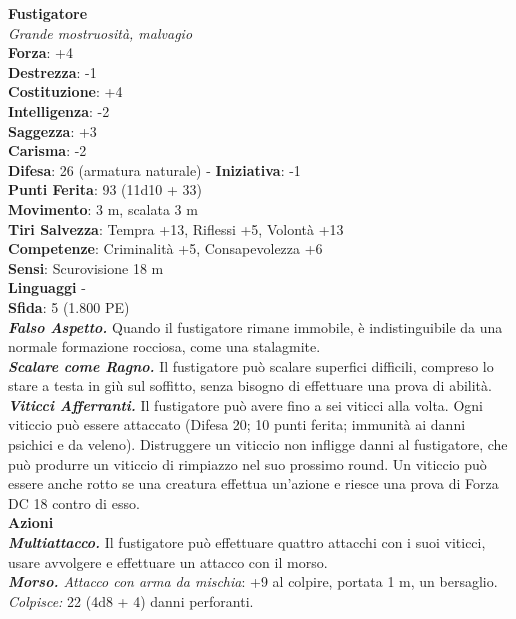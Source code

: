 \begin{multicols}{2}
\medskip\textbf{Fustigatore}\\
\emph{Grande mostruosità, malvagio}\\
\textbf{Forza}: +4\\
\textbf{Destrezza}: -1\\
\textbf{Costituzione}: +4\\
\textbf{Intelligenza}: -2\\
\textbf{Saggezza}: +3\\
\textbf{Carisma}: -2\\
\textbf{Difesa}: 26 (armatura naturale) - \textbf{Iniziativa}: -1\\
\textbf{Punti Ferita}: 93 (11d10 + 33)\\
\textbf{Movimento}: 3 m, scalata 3 m\\
\textbf{Tiri Salvezza}: Tempra +13, Riflessi +5, Volontà +13\\
\textbf{Competenze}: Criminalità +5, Consapevolezza +6\\
\textbf{Sensi}: Scurovisione 18 m\\
\textbf{Linguaggi} -\\
\textbf{Sfida}: 5 (1.800 PE)\smallskip\\
\emph{\textbf{Falso Aspetto.}} Quando il fustigatore rimane immobile, è indistinguibile da una normale formazione rocciosa, come una stalagmite.\\
\emph{\textbf{Scalare come Ragno.}} Il fustigatore può scalare superfici difficili, compreso lo stare a testa in giù sul soffitto, senza bisogno di effettuare una prova di abilità.\\
\emph{\textbf{Viticci Afferranti.}} Il fustigatore può avere fino a sei viticci alla volta. Ogni viticcio può essere attaccato (Difesa 20; 10 punti ferita; immunità ai danni psichici e da veleno). Distruggere un viticcio non infligge danni al fustigatore, che può produrre un viticcio di rimpiazzo nel suo prossimo round. Un viticcio può essere anche rotto se una creatura effettua un'azione e riesce una prova di Forza DC  18 contro di esso.\\
\smallskip\textbf{Azioni}\\
\emph{\textbf{Multiattacco.}} Il fustigatore può effettuare quattro attacchi con i suoi viticci, usare avvolgere e effettuare un attacco con il morso.\\
\emph{\textbf{Morso.} Attacco con arma da mischia}: +9 al colpire, portata 1 m, un bersaglio.\\
\emph{Colpisce:} 22 (4d8 + 4) danni perforanti.\\

\end{multicols}
